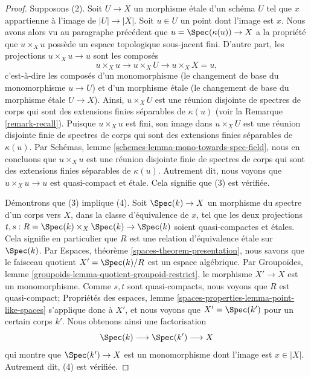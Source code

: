 \begin{proof}
\medskip\noindent
Supposons (2). Soit $U \to X$ un morphisme étale d'un schéma $U$
tel que $x$ appartienne à l'image de $|U| \to |X|$. Soit $u \in U$ un
point dont l'image est $x$. Nous avons alors vu au paragraphe précédent que
$u = \Spec(\kappa(u)) \to X$ a la propriété que
$u \times_X u$ possède un espace topologique sous-jacent fini. D'autre part,
les projections $u \times_X u \to u$ sont les composés
$$
u \times_X u \longrightarrow
u \times_X U \longrightarrow
u \times_X X = u,
$$
c'est-à-dire les composés d'un monomorphisme (le changement de base du
monomorphisme $u \to U$) et d'un morphisme étale (le changement de base du
morphisme étale $U \to X$). Ainsi, $u \times_X U$ est une réunion disjointe
de spectres de corps qui sont des extensions finies séparables de $\kappa(u)$
(voir la Remarque \ref{remark-recall}). Puisque $u \times_X u$ est fini, son
image dans $u \times_X U$ est une réunion disjointe finie de spectres de corps
qui sont des extensions finies séparables de $\kappa(u)$. Par
Schémas, lemme \ref{schemes-lemma-mono-towards-spec-field},
nous en concluons que $u \times_X u$ est une réunion disjointe finie de
spectres de corps qui sont des extensions finies séparables de $\kappa(u)$.
Autrement dit, nous voyons que $u \times_X u \to u$ est quasi-compact et
étale. Cela signifie que (3) est vérifiée.

\medskip\noindent
Démontrons que (3) implique (4). Soit $\Spec(k) \to X$ un morphisme
du spectre d'un corps vers $X$, dans la classe d'équivalence de $x$,
tel que les deux projections
$t, s : R = \Spec(k) \times_X \Spec(k)  \to \Spec(k)$
soient quasi-compactes et étales.
Cela signifie en particulier que $R$ est une relation d'équivalence étale
sur $\Spec(k)$.
Par Espaces, théorème \ref{spaces-theorem-presentation},
nous savons que le faisceau quotient
$X' = \Spec(k)/R$ est un espace algébrique. Par
Groupoïdes, lemme \ref{groupoids-lemma-quotient-groupoid-restrict},
le morphisme $X' \to X$ est un monomorphisme.
Comme $s, t$ sont quasi-compacts, nous voyons que $R$ est quasi-compact;
Propriétés des espaces,
lemme \ref{spaces-properties-lemma-point-like-spaces}
s'applique donc à $X'$, et nous voyons que
$X' = \Spec(k')$ pour un certain corps $k'$. Nous obtenons ainsi une
factorisation
$$
\Spec(k) \longrightarrow
\Spec(k') \longrightarrow X
$$
qui montre que $\Spec(k') \to X$ est un monomorphisme dont l'image est
$x \in |X|$. Autrement dit, (4) est vérifiée.


\end{proof}
